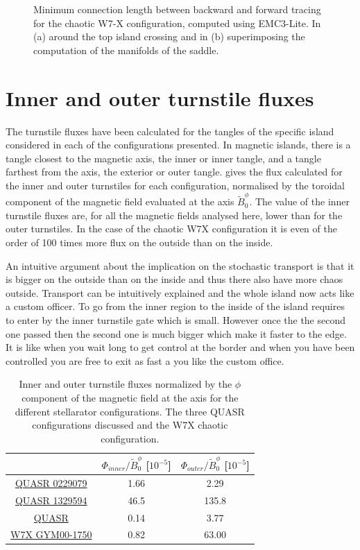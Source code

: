 \begin{figure}[H]
\begin{subfigure}[c]{0.5\textwidth}
        \caption{}
        \label{fig:cl-b}
    \end{subfigure}
    \caption{Minimum connection length between backward and forward tracing for the chaotic W7-X configuration, computed using EMC3-Lite. In (a) around the top island crossing and in (b) superimposing the computation of the manifolds of the saddle.}
    \label{fig:connection-length}
\end{figure}

\section{Inner and outer turnstile fluxes}

The turnstile fluxes have been calculated for the tangles of the specific island considered in each of the configurations presented. In magnetic islands, there is a tangle closest to the magnetic axis, the inner or inner tangle, and a tangle farthest from the axis, the exterior or outer tangle.  gives the flux calculated for the inner and outer turnstiles for each configuration, normalised by the toroidal component of the magnetic field evaluated at the axis $\tilde{B}_0^\phi$. The value of the inner turnstile fluxes are, for all the magnetic fields analysed here, lower than for the outer turnstiles. In the case of the chaotic W7X configuration it is even of the order of 100 times more flux on the outside than on the inside.

An intuitive argument about the implication on the stochastic transport is that it is bigger on the outside than on the inside and thus there also have more chaos outside. Transport can be intuitively explained and the whole island now acts like a custom officer. To go from the inner region to the inside of the island requires to enter by the inner turnstile gate which is small. However once the the second one passed then the second one is much bigger which make it faster to the edge. It is like when you wait long to get control at the border and when you have been controlled you are free to exit as fast a you like the custom office.

\begin{table}[H]
    \centering
    \begin{tabular}{c|c|c}
        & $\Phi_{inner}/\tilde{B}_0^\phi$ [$10^{-5}$] & $\Phi_{outer}/\tilde{B}_0^\phi$ [$10^{-5}$]\\ 
        \hline \hyperref[sec:quars-0229079]{QUASR 0229079} & 1.66 & 2.29\\
        \hline \hyperref[sec:quars-0928241]{QUASR 1329594} & 46.5 & 135.8\\
        \hline \hyperref[sec:quars-1329594]{QUASR} & 0.14 & 3.77\\
        \hline \hyperref[sec:w7x]{W7X GYM00-1750} & 0.82 & 63.00\\
    \end{tabular}
    \caption{Inner and outer turnstile fluxes normalized by the $\phi$ component of the magnetic field at the axis for the different stellarator configurations. The three QUASR configurations discussed and the W7X chaotic configuration.}
    \label{tab:inner-outer-fluxes}
\end{table}